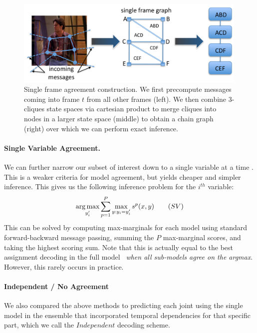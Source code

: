 \begin{figure}[tb]
\begin{center}
\includegraphics[width=0.99\textwidth]{figs/single-frame-agreement.pdf}
\caption[Single Frame Agreement construction]{Single frame agreement 
construction.  We first precompute messages coming into frame $t$ from all 
other frames (left).  We then combine 3-cliques state spaces via cartesian 
product to merge cliques into nodes in a larger state space (middle) to obtain 
a chain graph (right) over which we can perform exact inference.}
\label{fig:single-frame-agreement}
\end{center}
\end{figure}



\paragraph{Single Variable Agreement.} 

We can further narrow our subset of interest down to a single variable
at a time \cite{weisssapp10}.  This is a weaker criteria for model
agreement, but yields cheaper and simpler inference.  This gives us
the following inference problem for the $i^{th}$ variable:
\begin{equation}
\mathop{\arg\max}_{y_i'} \sum_{p=1}^P \max_{y: y_i=y_i'} s^p(x,y) \quad{}\quad{(SV)}
\end{equation}
This can be solved by computing max-marginals for each model using standard forward-backward message passing, summing the $P$ max-marginal scores, and taking the highest scoring sum.
Note that this is actually equal to the best assignment decoding in the full 
model~ {\em when all sub-models agree on the argmax}.  
However, this rarely occurs in practice.

\paragraph{Independent / No Agreement}
We also compared the above methods to predicting each joint using the single 
model in the ensemble that incorporated temporal dependencies for that
specific part, which we call the $Independent$ decoding scheme.



